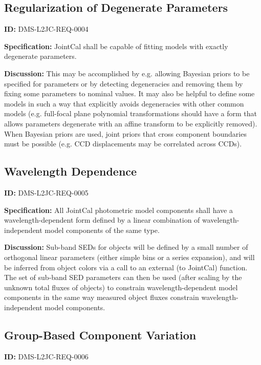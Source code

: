 \documentclass[SE,toc,lsstdraft]{lsstdoc}
\begin{document}
\subsection{Regularization of Degenerate Parameters}

\label{DMS-L2JC-REQ-0004}
\textbf{ID:} DMS-L2JC-REQ-0004

\textbf{Specification:}
JointCal shall be capable of fitting models with exactly degenerate parameters.

\textbf{Discussion:}
This may be accomplished by e.g. allowing Bayesian priors to be specified for parameters or by detecting degeneracies and removing them by fixing some parameters to nominal values.  It may also be helpful to define some models in such a way that explicitly avoids degeneracies with other common models (e.g. full-focal plane polynomial transformations should have a form that allows parameters degenerate with an affine transform to be explicitly removed).  When Bayesian priors are used, joint priors that cross component boundaries must be possible (e.g. CCD displacements may be correlated across CCDs).

\subsection{Wavelength Dependence}

\label{DMS-L2JC-REQ-0005}
\textbf{ID:} DMS-L2JC-REQ-0005

\textbf{Specification:}
All JointCal photometric model components shall have a wavelength-dependent form defined by a linear combination of wavelength-independent model components of the same type.

\textbf{Discussion:}
Sub-band SEDs for objects will be defined by a small number of orthogonal linear parameters (either simple bins or a series expansion), and will be inferred from object colors via a call to an external (to JointCal) function.  The set of sub-band SED parameters can then be used (after scaling by the unknown total fluxes of objects) to constrain wavelength-dependent model components in the same way measured object fluxes constrain wavelength-independent model components.

\subsection{Group-Based Component Variation}

\label{DMS-L2JC-REQ-0006}
\textbf{ID:} DMS-L2JC-REQ-0006
\end{document}
